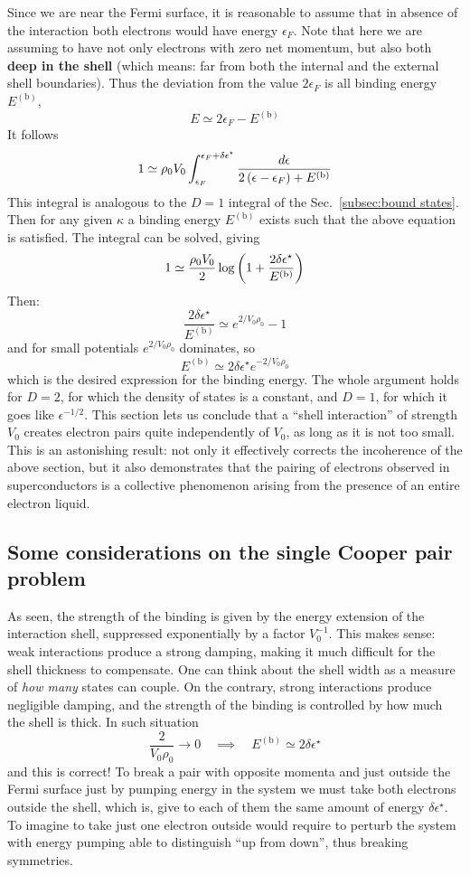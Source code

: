 Since we are near the Fermi surface, it is reasonable to assume that in absence of the interaction both electrons would have energy $\epsilon_F$. Note that here we are assuming to have not only electrons with zero net momentum, but also both \textbf{deep in the shell} (which means: far from both the internal and the external shell boundaries). Thus the deviation from the value $2\epsilon_F$ is all binding energy $E^{(\mathrm{b})}$,
\[
	E \simeq 2 \epsilon_F - E^{(\mathrm{b})}
\]
It follows
\[
	1 \simeq \rho_0 V_0 \int_{\epsilon_F}^{\epsilon_F+\delta\epsilon^\star} \frac{d\epsilon}{2\left({\epsilon-\epsilon_F}\right) + E^{(\mathrm{b})}}
\]
This integral is analogous to the $D=1$ integral of the Sec.~\ref{subsec:bound states}. Then for any given $\kappa$ a binding energy $E^{(\mathrm{b})}$ exists such that the above equation is satisfied. The integral can be solved, giving
\[
	1 \simeq \frac{\rho_0 V_0}{2} \log \left({1+ \frac{2\delta\epsilon^\star}{E^{(\mathrm{b})}}}\right)
\]
Then:
\[
	\frac{2\delta\epsilon^\star}{E^{(\mathrm{b})}} \simeq e^{2/V_0 \rho_0} - 1
\]
and for small potentials $e^{2/V_0 \rho_0}$ dominates, so
\[
	E^{(\mathrm{b})} \simeq 2\delta\epsilon^\star e^{-2/V_0 \rho_0}
\]
which is the desired expression for the binding energy. The whole argument holds for $D=2$, for which the density of states is a constant, and $D=1$, for which it goes like $\epsilon^{-1/2}$. This section lets us conclude that a ``shell interaction'' of strength $V_0$ creates electron pairs quite independently of $V_0$, as long as it is not too small. This is an astonishing result: not only it effectively corrects the incoherence of the above section, but it also demonstrates that the pairing of electrons observed in superconductors is a collective phenomenon arising from the presence of an entire electron liquid.

\subsection{Some considerations on the single Cooper pair problem}\label{subsec:some considerations on the single Cooper pair problem}

As seen, the strength of the binding is given by the energy extension of the interaction shell, suppressed exponentially by a factor $V_0^{-1}$. This makes sense: weak interactions produce a strong damping, making it much difficult for the shell thickness to compensate. One can think about the shell width as a measure of \textit{how many} states can couple. On the contrary, strong interactions produce negligible damping, and the strength of the binding is controlled by how much the shell is thick.
In such situation
\[
	\frac{2}{V_0 \rho_0} \to 0
	\quad\implies\quad
	E^{(\mathrm{b})} \simeq 2\delta\epsilon^\star
\]
and this is correct! To break a pair with opposite momenta and just outside the Fermi surface just by pumping energy in the system we must take both electrons outside the shell, which is, give to each of them the same amount of energy $\delta\epsilon^\star$. To imagine to take just one electron outside would require to perturb the system with energy pumping able to distinguish ``up from down'', thus breaking symmetries.

